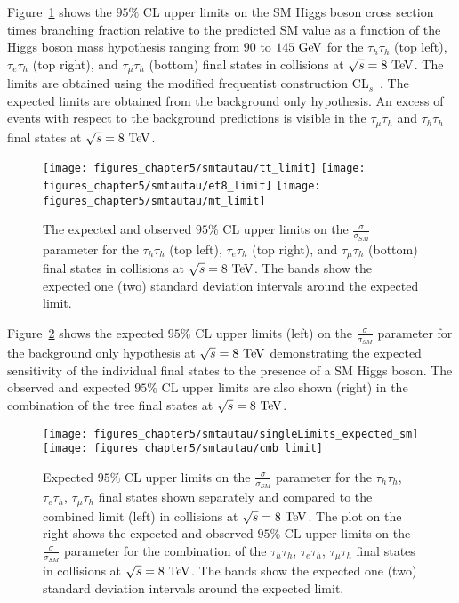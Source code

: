 Figure~\ref{fig:ind} shows the $95\%$ CL upper limits on the SM Higgs boson cross section times branching fraction relative to the predicted SM value as a function of the Higgs boson mass hypothesis ranging from $90$ to $145~\mathrm{Ge\kern -0.1em V}$ for the $\tau_{h}\tau_{h}$ (top left), $\tau_{e}\tau_{h}$ (top right), and $\tau_{\mu}\tau_{h}$ (bottom) final states in collisions at $\sqrt{s}=8~\mathrm{Te\kern -0.1em V}$. The limits are obtained using the modified frequentist construction CL$_{s}$~\cite{Read, Read2}.  The expected limits are obtained from the background only hypothesis. An excess of events with respect to the background predictions is visible in the $\tau_{\mu}\tau_h$ and $\tau_{h}\tau_h$ final states at $\sqrt{s}=8~\mathrm{Te\kern -0.1em V}$.
\begin{figure}[htbp]
\centering
\texttt{[image: figures\_chapter5/smtautau/tt\_limit]}
\texttt{[image: figures\_chapter5/smtautau/et8\_limit]}
\texttt{[image: figures\_chapter5/smtautau/mt\_limit]}
\caption{The expected and observed $95\%$ CL upper limits on the $\frac{\sigma}{\sigma_{SM}}$ parameter for the $\tau_{h}\tau_{h}$ (top left), $\tau_{e}\tau_{h}$ (top right), and $\tau_{\mu}\tau_{h}$ (bottom) final states in collisions at $\sqrt{s}=8~\mathrm{Te\kern -0.1em V}$. The bands show the expected one (two) standard deviation intervals around the expected limit.}
\label{fig:ind}
\end{figure}
Figure~\ref{fig:cmblim}  shows the expected $95\%$ CL upper limits (left) on the  $\frac{\sigma}{\sigma_{SM}}$ parameter for the background only hypothesis at $\sqrt{s}=8~\mathrm{Te\kern -0.1em V}$ demonstrating the expected sensitivity of the individual final states to the presence of a SM Higgs boson. The observed and expected $95\%$ CL upper limits are also shown (right) in the combination of the tree final states at $\sqrt{s}=8~\mathrm{Te\kern -0.1em V}$. 
\begin{figure}[htbp]
\centering
\texttt{[image: figures\_chapter5/smtautau/singleLimits\_expected\_sm]}
\texttt{[image: figures\_chapter5/smtautau/cmb\_limit]}
\caption{Expected $95\%$ CL upper limits on the $\frac{\sigma}{\sigma_{SM}}$ parameter for the $\tau_{h}\tau_{h}$, $\tau_{e}\tau_{h}$, $\tau_{\mu}\tau_{h}$ final states shown separately and compared to the combined limit (left) in collisions at $\sqrt{s}=8~\mathrm{Te\kern -0.1em V}$. The plot on the right shows the expected and observed $95\%$ CL upper limits on the $\frac{\sigma}{\sigma_{SM}}$ parameter for the combination of the $\tau_{h}\tau_{h}$, $\tau_{e}\tau_{h}$, $\tau_{\mu}\tau_{h}$ final states in collisions at $\sqrt{s}=8~\mathrm{Te\kern -0.1em V}$. The bands show the expected one (two) standard deviation intervals around the expected limit.}
\label{fig:cmblim}
\end{figure}

